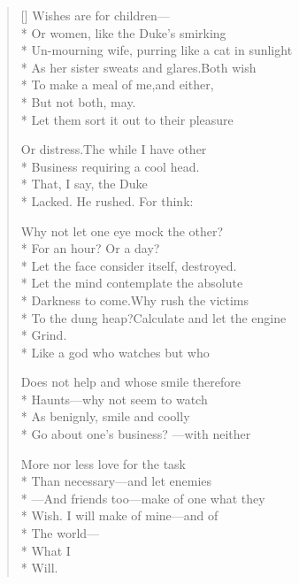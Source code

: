 \label{ch:lear_ay}
\settowidth{\versewidth}{To the dung heap?\qquad Calculate and let the engine}
\begin{verse}[\versewidth]
 Wishes are for children---\\*
Or women, like the Duke's smirking\\*
Un-mourning wife, purring like a cat in sunlight\\*
As her sister sweats and glares.\qquad Both wish\\*
To make a meal of me,\qquad and either,\\*
But not both,  may.\\*
Let them sort it out to their pleasure

Or distress.\qquad The while I have other\\*
Business requiring a cool head.\\*
\qquad \qquad \qquad \qquad That, I say, the Duke\\*
Lacked.  He rushed. For think:

Why not let one eye mock the other?\\*
For an hour? Or a day?\\*
Let the face consider itself, destroyed.\\*
Let the mind contemplate the absolute\\*
Darkness to come.\qquad Why rush the victims\\*
To the dung heap?\qquad Calculate and let the engine\\*
Grind.\\*
\qquad Like a god who watches but who

Does not help and whose smile therefore\\*
Haunts---why not seem to watch\\*
As benignly, smile and coolly\\*
Go about one's business?  ---with neither

More nor less love for the task\\*
Than necessary---and let enemies\\*
---And friends too---make of one what they\\*
Wish.   I will make of mine---and of\\*
The world---\\*
What I\\*
Will.
\end{verse}
